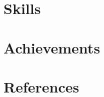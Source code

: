 \documentclass{article}
\begin{document}
\section{Skills}

\section{Achievements}

\section{References}
\end{document}
